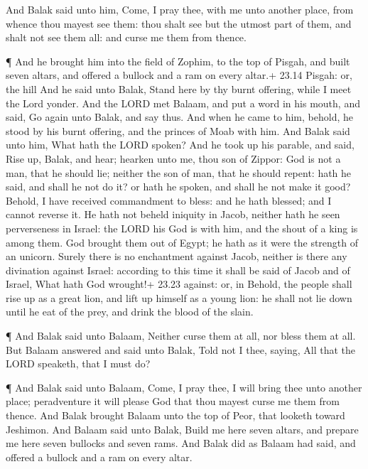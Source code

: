  And Balak said unto him, Come, I pray thee, with me unto
another place, from whence thou mayest see them: thou shalt see but the
utmost part of them, and shalt not see them all: and curse me them from
thence.

 ¶ And he brought him into the field of Zophim, to the top
of Pisgah, and built seven altars, and offered a bullock and a ram on
every altar.+ 23.14 Pisgah: or, the hill  And he said unto
Balak, Stand here by thy burnt offering, while I meet the Lord yonder.
 And the LORD met Balaam, and put a word in his mouth, and
said, Go again unto Balak, and say thus.  And when he came
to him, behold, he stood by his burnt offering, and the princes of Moab
with him. And Balak said unto him, What hath the LORD spoken?
 And he took up his parable, and said, Rise up, Balak, and
hear; hearken unto me, thou son of Zippor:  God is not a
man, that he should lie; neither the son of man, that he should repent:
hath he said, and shall he not do it? or hath he spoken, and shall he
not make it good?  Behold, I have received commandment to
bless: and he hath blessed; and I cannot reverse it.  He
hath not beheld iniquity in Jacob, neither hath he seen perverseness in
Israel: the LORD his God is with him, and the shout of a king is among
them.  God brought them out of Egypt; he hath as it were
the strength of an unicorn.  Surely there is no enchantment
against Jacob, neither is there any divination against Israel: according
to this time it shall be said of Jacob and of Israel, What hath God
wrought!+ 23.23 against: or, in  Behold, the people shall
rise up as a great lion, and lift up himself as a young lion: he shall
not lie down until he eat of the prey, and drink the blood of the slain.

 ¶ And Balak said unto Balaam, Neither curse them at all,
nor bless them at all.  But Balaam answered and said unto
Balak, Told not I thee, saying, All that the LORD speaketh, that I must
do?

 ¶ And Balak said unto Balaam, Come, I pray thee, I will
bring thee unto another place; peradventure it will please God that thou
mayest curse me them from thence.  And Balak brought Balaam
unto the top of Peor, that looketh toward Jeshimon.  And
Balaam said unto Balak, Build me here seven altars, and prepare me here
seven bullocks and seven rams.  And Balak did as Balaam had
said, and offered a bullock and a ram on every altar.

